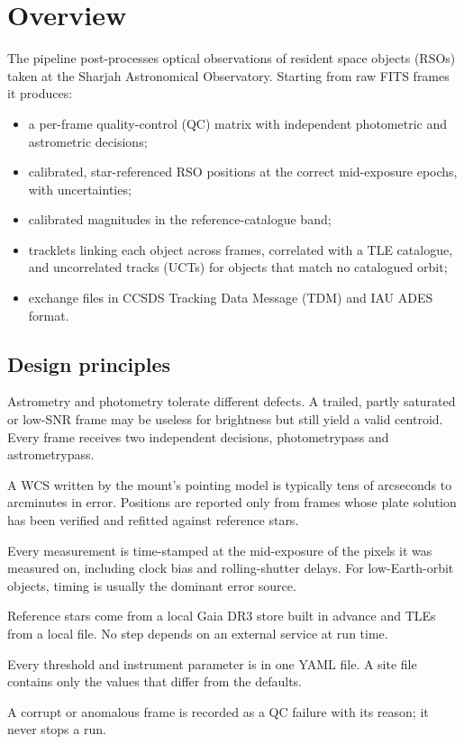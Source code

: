 \documentclass[11pt,a4paper]{article}
\newcommand{\brkus}{\textunderscore\allowbreak}
\newcommand{\code}[1]{{\ttfamily\let\_\brkus #1}}
\begin{document}
\section{Overview}

The pipeline post-processes optical observations of resident space objects (RSOs) taken
at the Sharjah Astronomical Observatory. Starting from raw FITS frames it produces:

\begin{itemize}
  \item a per-frame quality-control (QC) matrix with independent photometric and astrometric decisions;
  \item calibrated, star-referenced RSO positions at the correct mid-exposure epochs, with uncertainties;
  \item calibrated magnitudes in the reference-catalogue band;
  \item tracklets linking each object across frames, correlated with a TLE catalogue, and
        uncorrelated tracks (UCTs) for objects that match no catalogued orbit;
  \item exchange files in CCSDS Tracking Data Message (TDM) and IAU ADES format.
\end{itemize}

\subsection{Design principles}

\begin{description}[style=nextline,leftmargin=0pt,font=\sffamily\bfseries\color{navy}]
\item[Two quality tracks]
Astrometry and photometry tolerate different defects. A trailed, partly saturated or
low-SNR frame may be useless for brightness but still yield a valid centroid. Every frame
receives two independent decisions, \code{photometry\_pass} and \code{astrometry\_pass}.
\item[Verified astrometry only]
A WCS written by the mount's pointing model is typically tens of arcseconds to arcminutes
in error. Positions are reported only from frames whose plate solution has been verified
and refitted against reference stars.
\item[Correct epochs]
Every measurement is time-stamped at the mid-exposure of the pixels it was measured on,
including clock bias and rolling-shutter delays. For low-Earth-orbit objects, timing is
usually the dominant error source.
\item[Offline by design]
Reference stars come from a local Gaia DR3 store built in advance and TLEs from a local
file. No step depends on an external service at run time.
\item[Configuration, not code]
Every threshold and instrument parameter is in one YAML file. A site file contains only
the values that differ from the defaults.
\item[Batch safety]
A corrupt or anomalous frame is recorded as a QC failure with its reason; it never stops
a run.
\end{description}
\end{document}
